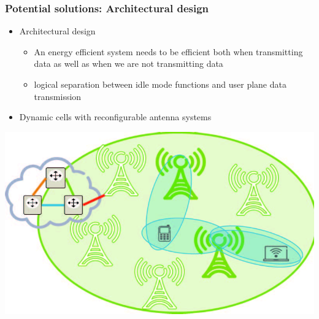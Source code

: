 \documentclass[a4paper,11pt,handout]{beamer}
\begin{document}
\begin{frame}
	\frametitle{Potential solutions: Architectural design }
    \begin{itemize} 
\item Architectural design
\begin{itemize}
\item An energy efficient system needs to be efficient both when transmitting data as well as when we are not transmitting data
\item logical separation between idle mode functions and user plane data transmission
\end{itemize}

\item Dynamic cells with reconfigurable antenna systems 
\end{itemize}
\begin{center}
	\includegraphics[scale=1]{Logical_separation_between_idle_mode_and_active_mode_network}
	\end{center}    
    
\end{frame}
\end{document}

